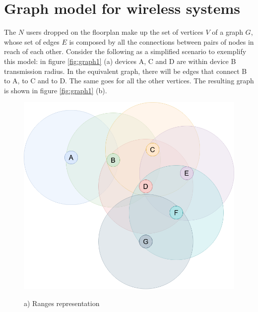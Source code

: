 \section{Graph model for wireless systems}\label{sec:graphModelForWirelessSystems}
The $N$ users dropped on the floorplan make up the set of vertices $V$ of a
graph $G$, whose set of edges $E$ is composed by all the connections between
pairs of nodes in reach of each other. Consider the following as a simplified
scenario to exemplify this model: in figure \ref{fig:graph1} (a) devices A, C
and D are within device B transmission radius. In the equivalent graph, there
will be edges that connect B to A, to C and to D. The same goes for all the
other vertices. The resulting graph is shown in figure \ref{fig:graph1} (b).
\begin{figure}[H]
	\begin{minipage}{.5\textwidth}
        \includegraphics[scale=.23]{img/wireless_graph_1.png}
        \begin{center}
            a) Ranges representation
        \end{center}
	\end{minipage}
	\begin{minipage}{.5\textwidth} 

\end{minipage}
\end{figure}
